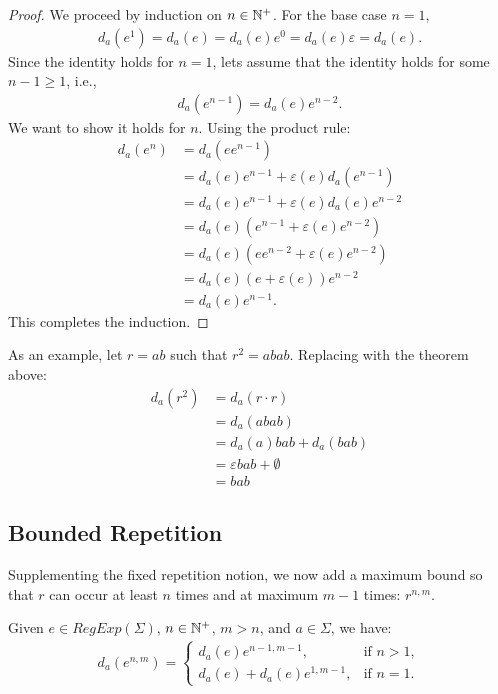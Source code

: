 \begin{proof}
	We proceed by induction on $n \in {\mathbb{N}^{+}}$. For the base case \( n = 1 \),
	\begin{align*}
		d_a(e^1) = d_a(e) = d_a(e)e^0 = d_a(e)\varepsilon = d_a(e).
	\end{align*}
	Since the identity holds for \(n = 1\), lets assume that the identity holds for some \(n-1 \geq 1\), i.e.,
	\begin{align*}
		d_a(e^{n-1}) = d_a(e)e^{n-2}.
	\end{align*}
	We want to show it holds for \(n\). Using the product rule:
	\begin{align*}
		d_a(e^n) &= d_a(ee^{n-1}) \\
		&= d_a(e) e^{n-1} + \varepsilon(e) d_a(e^{n-1}) \\
		&= d_a(e) e^{n-1} + \varepsilon(e) d_a(e) e^{n-2} \\
		&= d_a(e) \left(e^{n-1} + \varepsilon(e) e^{n-2}\right) \\
		&= d_a(e) \left(ee^{n-2} + \varepsilon(e) e^{n-2}\right) \\
		&= d_a(e) (e + \varepsilon(e))e^{n-2} \\
		&= d_a(e) e^{n-1}.
	\end{align*}
	This completes the induction.
\end{proof}

As an example, let $r = ab$ such that $r^2 = abab$. Replacing with the theorem above:
\begin{align*}
	d_a(r^2) &= d_a(r \cdot r) \\
	&= d_a(abab)  \\
	&= d_a(a)bab + d_a(bab) \\
	&= \varepsilon bab + \emptyset \\
	&= bab
\end{align*}


\subsection{Bounded Repetition}
Supplementing the fixed repetition notion, we now add a maximum bound so that $r$ can occur at least $n$ times and at maximum $m-1$ times: $r^{n,m}$.

\begin{thm}
	Given $e \in RegExp(\Sigma)$, $n \in {\mathbb{N}^{+}}$, $m > n$, and $a \in \Sigma$, we have:
	\begin{align*}
		d_a(e^{n,m}) =
		\begin{cases}
			d_a(e) e^{n-1,m-1}, & \text{if } n > 1, \\
			d_a(e) + d_a(e) e^{1,m-1}, & \text{if } n = 1.
		\end{cases}
	\end{align*}
\end{thm}

